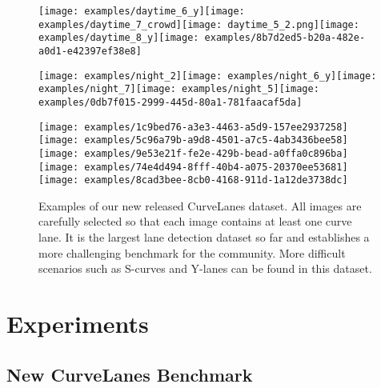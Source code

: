 \documentclass[runningheads]{llncs}
\begin{document}
\begin{figure}[tb]


\begin{centering}
\texttt{[image: examples/daytime\_6\_y]}\texttt{[image: examples/daytime\_7\_crowd]}\texttt{[image: daytime\_5\_2.png]}\texttt{[image: examples/daytime\_8\_y]}\texttt{[image: examples/8b7d2ed5-b20a-482e-a0d1-e42397ef38e8]}
\par\end{centering}
\begin{centering}
\texttt{[image: examples/night\_2]}\texttt{[image: examples/night\_6\_y]}\texttt{[image: examples/night\_7]}\texttt{[image: examples/night\_5]}\texttt{[image: examples/0db7f015-2999-445d-80a1-781faacaf5da]}
\par\end{centering}
\begin{centering}
\texttt{[image: examples/1c9bed76-a3e3-4463-a5d9-157ee2937258]}\texttt{[image: examples/5c96a79b-a9d8-4501-a7c5-4ab3436bee58]}\texttt{[image: examples/9e53e21f-fe2e-429b-bead-a0ffa0c896ba]}\texttt{[image: examples/74e4d494-8fff-40b4-a075-20370ee53681]}\texttt{[image: examples/8cad3bee-8cb0-4168-911d-1a12de3738dc]}
\par\end{centering}

\caption{\label{fig:Examples-of-CurveLanes}Examples of our new released CurveLanes
dataset. All images are carefully selected so that each image contains
at least one curve lane. It is the largest lane detection dataset
so far and establishes a more challenging benchmark for the community.
More difficult scenarios such as S-curves and Y-lanes can be found
in this dataset.}
\end{figure}


\section{Experiments}

\subsection{New CurveLanes Benchmark}
\end{document}
